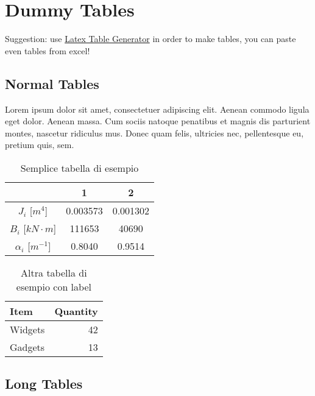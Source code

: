 
\chapter{Dummy Tables}

Suggestion: use \href{https://www.tablesgenerator.com/}{Latex Table Generator} in order to make tables, you can paste even tables from excel!


\section{Normal Tables}

Lorem ipsum dolor sit amet, consectetuer adipiscing elit. Aenean commodo ligula eget dolor. Aenean massa. Cum sociis natoque penatibus et magnis dis parturient montes, nascetur ridiculus mus. Donec quam felis, ultricies nec, pellentesque eu, pretium quis, sem.

\begin{table}[H]
\centering
\begin{tabular}{c|c|c}
                      & 1        & 2        \\ \hline
$J_i$ [$m^4$]         & 0.003573 & 0.001302 \\
$B_i$ [$kN\cdot m$]   & 111653   & 40690    \\ 
$\alpha_i$ [$m^{-1}$] & 0.8040   & 0.9514  \\ \hline
\end{tabular}

\caption{Semplice tabella di esempio}
\end{table}

\begin{table}[H]
\centering
\begin{tabular}{l|r}

Item & Quantity \\ \hline
Widgets & 42 \\
Gadgets & 13 \\ \hline

\end{tabular}
\caption{\label{tab:widgets}Altra tabella di esempio con label}
\end{table}


\section{Long Tables}

